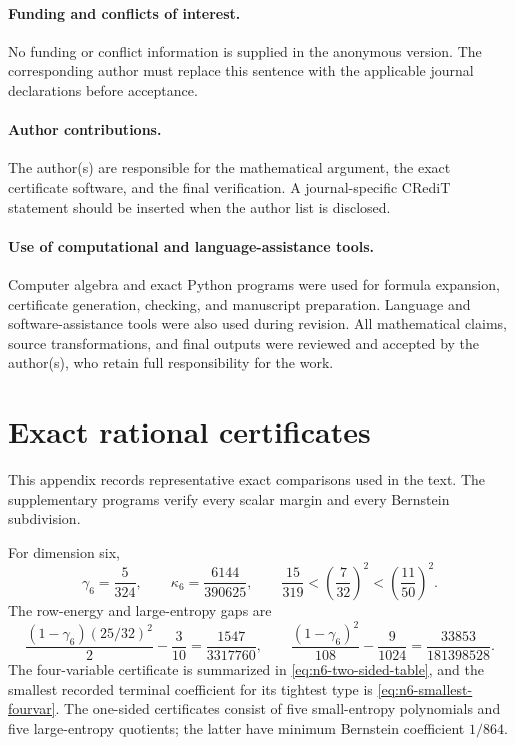 \documentclass[11pt,a4paper]{article}
\numberwithin{equation}{section}
\theoremstyle{definition}
\newcommand{\1}{\mathbf{1}}
\begin{document}
\paragraph{Funding and conflicts of interest.}
No funding or conflict information is supplied in the anonymous version.
The corresponding author must replace this sentence with the applicable
journal declarations before acceptance.

\paragraph{Author contributions.}
The author(s) are responsible for the mathematical argument, the exact
certificate software, and the final verification.  A journal-specific CRediT
statement should be inserted when the author list is disclosed.

\paragraph{Use of computational and language-assistance tools.}
Computer algebra and exact Python programs were used for formula expansion,
certificate generation, checking, and manuscript preparation.  Language and
software-assistance tools were also used during revision.  All mathematical
claims, source transformations, and final outputs were reviewed and accepted
by the author(s), who retain full responsibility for the work.

\appendix

\section{Exact rational certificates}\label{app:certificates}

This appendix records representative exact comparisons used in the text.
The supplementary programs verify every scalar margin and every Bernstein
subdivision.

For dimension six,
\[
 \gamma_6=\frac5{324},\qquad
 \kappa_6=\frac{6144}{390625},\qquad
 \frac{15}{319}<\left(\frac7{32}\right)^2
 <\left(\frac{11}{50}\right)^2.
\]
The row-energy and large-entropy gaps are
\[
 \frac{(1-\gamma_6)(25/32)^2}{2}-\frac3{10}
 =\frac{1547}{3317760},
 \qquad
 \frac{(1-\gamma_6)^2}{108}-\frac9{1024}
 =\frac{33853}{181398528}.
\]
The four-variable certificate is summarized in
\eqref{eq:n6-two-sided-table}, and the smallest recorded terminal
coefficient for its tightest type is
\eqref{eq:n6-smallest-fourvar}.  The one-sided certificates consist of five
small-entropy polynomials and five large-entropy quotients; the latter have
minimum Bernstein coefficient $1/864$.
\end{document}
